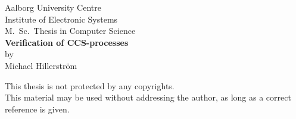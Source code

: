 \begin{titlepage}
\begin{center}
\large Aalborg University Centre\\
Institute of Electronic Systems\\
M.~Sc.~Thesis in Computer Science\\[4cm]

{\bf\huge Verification of CCS-processes}\\
\normalsize by\\
Michael Hillerstr\"om\\

\vfill
\begin{flushleft}
\scriptsize
This thesis is not protected by any copyrights.\\
This material may be used without addressing the author, as long as a correct reference is given.
\end{flushleft}
\end{center}
\end{titlepage}
